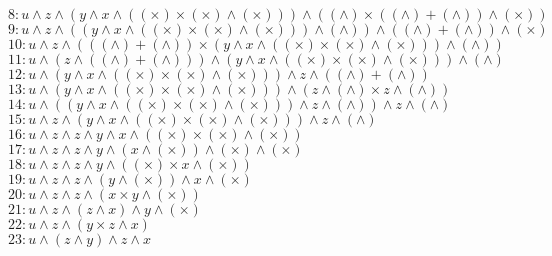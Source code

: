 \documentclass{article}
\newcommand{\Varid}[1]{\mathit{#1}}
\begin{document}
\begin{tabbing}
${\mathrm{8}\mathbin{:}\Varid{u}\wedge\Varid{z}\wedge(\Varid{y}\wedge\Varid{x}\wedge((\times)\times(\times)\wedge(\times)))\wedge((\wedge)\times((\wedge)\mathbin{+}(\wedge))\wedge(\times))}$\\
${\mathrm{9}\mathbin{:}\Varid{u}\wedge\Varid{z}\wedge((\Varid{y}\wedge\Varid{x}\wedge((\times)\times(\times)\wedge(\times)))\wedge(\wedge))\wedge((\wedge)\mathbin{+}(\wedge))\wedge(\times)}$\\
${\mathrm{10}\mathbin{:}\Varid{u}\wedge\Varid{z}\wedge(((\wedge)\mathbin{+}(\wedge))\times(\Varid{y}\wedge\Varid{x}\wedge((\times)\times(\times)\wedge(\times)))\wedge(\wedge))}$\\
${\mathrm{11}\mathbin{:}\Varid{u}\wedge(\Varid{z}\wedge((\wedge)\mathbin{+}(\wedge)))\wedge(\Varid{y}\wedge\Varid{x}\wedge((\times)\times(\times)\wedge(\times)))\wedge(\wedge)}$\\
${\mathrm{12}\mathbin{:}\Varid{u}\wedge(\Varid{y}\wedge\Varid{x}\wedge((\times)\times(\times)\wedge(\times)))\wedge\Varid{z}\wedge((\wedge)\mathbin{+}(\wedge))}$\\
${\mathrm{13}\mathbin{:}\Varid{u}\wedge(\Varid{y}\wedge\Varid{x}\wedge((\times)\times(\times)\wedge(\times)))\wedge(\Varid{z}\wedge(\wedge)\times\Varid{z}\wedge(\wedge))}$\\
${\mathrm{14}\mathbin{:}\Varid{u}\wedge((\Varid{y}\wedge\Varid{x}\wedge((\times)\times(\times)\wedge(\times)))\wedge\Varid{z}\wedge(\wedge))\wedge\Varid{z}\wedge(\wedge)}$\\
${\mathrm{15}\mathbin{:}\Varid{u}\wedge\Varid{z}\wedge(\Varid{y}\wedge\Varid{x}\wedge((\times)\times(\times)\wedge(\times)))\wedge\Varid{z}\wedge(\wedge)}$\\
${\mathrm{16}\mathbin{:}\Varid{u}\wedge\Varid{z}\wedge\Varid{z}\wedge\Varid{y}\wedge\Varid{x}\wedge((\times)\times(\times)\wedge(\times))}$\\
${\mathrm{17}\mathbin{:}\Varid{u}\wedge\Varid{z}\wedge\Varid{z}\wedge\Varid{y}\wedge(\Varid{x}\wedge(\times))\wedge(\times)\wedge(\times)}$\\
${\mathrm{18}\mathbin{:}\Varid{u}\wedge\Varid{z}\wedge\Varid{z}\wedge\Varid{y}\wedge((\times)\times\Varid{x}\wedge(\times))}$\\
${\mathrm{19}\mathbin{:}\Varid{u}\wedge\Varid{z}\wedge\Varid{z}\wedge(\Varid{y}\wedge(\times))\wedge\Varid{x}\wedge(\times)}$\\
${\mathrm{20}\mathbin{:}\Varid{u}\wedge\Varid{z}\wedge\Varid{z}\wedge(\Varid{x}\times\Varid{y}\wedge(\times))}$\\
${\mathrm{21}\mathbin{:}\Varid{u}\wedge\Varid{z}\wedge(\Varid{z}\wedge\Varid{x})\wedge\Varid{y}\wedge(\times)}$\\
${\mathrm{22}\mathbin{:}\Varid{u}\wedge\Varid{z}\wedge(\Varid{y}\times\Varid{z}\wedge\Varid{x})}$\\
${\mathrm{23}\mathbin{:}\Varid{u}\wedge(\Varid{z}\wedge\Varid{y})\wedge\Varid{z}\wedge\Varid{x}}$
\end{tabbing}
\end{document}

